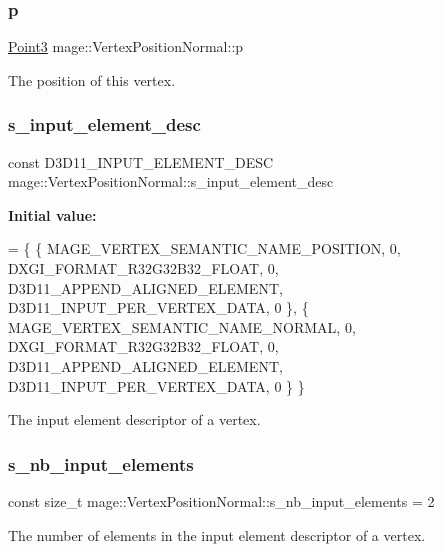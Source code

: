\subsubsection{\texorpdfstring{p}{p}}
{\footnotesize\ttfamily \hyperlink{structmage_1_1_point3}{Point3} mage\+::\+Vertex\+Position\+Normal\+::p}

The position of this vertex. \hypertarget{structmage_1_1_vertex_position_normal_aa597c602ce172e523bece0e75d157081}{}\label{structmage_1_1_vertex_position_normal_aa597c602ce172e523bece0e75d157081} 
\subsubsection{\texorpdfstring{s\+\_\+input\+\_\+element\+\_\+desc}{s\_input\_element\_desc}}
{\footnotesize\ttfamily const D3\+D11\+\_\+\+I\+N\+P\+U\+T\+\_\+\+E\+L\+E\+M\+E\+N\+T\+\_\+\+D\+E\+SC mage\+::\+Vertex\+Position\+Normal\+::s\+\_\+input\+\_\+element\+\_\+desc\hspace{0.3cm}{\ttfamily [static]}}

{\bfseries Initial value\+:}
\begin{DoxyCode}
= \{
        \{ MAGE\_VERTEX\_SEMANTIC\_NAME\_POSITION, 0, DXGI\_FORMAT\_R32G32B32\_FLOAT,    0, 
      D3D11\_APPEND\_ALIGNED\_ELEMENT, D3D11\_INPUT\_PER\_VERTEX\_DATA, 0 \},
        \{ MAGE\_VERTEX\_SEMANTIC\_NAME\_NORMAL,   0, DXGI\_FORMAT\_R32G32B32\_FLOAT,    0, 
      D3D11\_APPEND\_ALIGNED\_ELEMENT, D3D11\_INPUT\_PER\_VERTEX\_DATA, 0 \}
    \}
\end{DoxyCode}
The input element descriptor of a vertex. \hypertarget{structmage_1_1_vertex_position_normal_a6201d147655b9fb0cf6117ba724b07ef}{}\label{structmage_1_1_vertex_position_normal_a6201d147655b9fb0cf6117ba724b07ef} 
\subsubsection{\texorpdfstring{s\+\_\+nb\+\_\+input\+\_\+elements}{s\_nb\_input\_elements}}
{\footnotesize\ttfamily const size\+\_\+t mage\+::\+Vertex\+Position\+Normal\+::s\+\_\+nb\+\_\+input\+\_\+elements = 2\hspace{0.3cm}{\ttfamily [static]}}

The number of elements in the input element descriptor of a vertex. 
